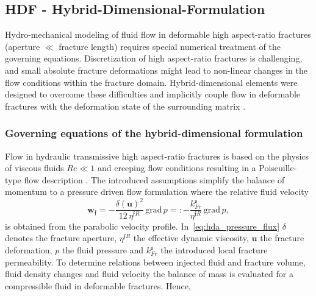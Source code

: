 \subsection{HDF - Hybrid-Dimensional-Formulation}
Hydro-mechanical modeling of fluid flow in deformable high aspect-ratio fractures (aperture $\ll$ fracture length) requires special numerical treatment of the governing equations. Discretization of high aspect-ratio fractures is challenging, and small absolute fracture deformations might lead to non-linear changes in the flow conditions within the fracture domain. Hybrid-dimensional elements were designed to overcome these difficulties and implicitly couple flow in deformable fractures with the deformation state of the surrounding matrix \cite{vinci2014, vinci2015,KIM20112094,KIM20111591,Girault2015,Girault2016,Castelletto2015,segura2004,segura2008coupledI,segura2008coupledII,vinci2014hydro,settgast2017fully,schmidt2019}.
\subsubsection*{Governing equations of the hybrid-dimensional formulation}
Flow in hydraulic transmissive high aspect-ratio fractures is based on the physics of viscous fluids $Re \ll 1$ and creeping flow conditions resulting in a Poiseuille-type flow description \cite{witherspoon1979}. The introduced assumptions simplify the balance of momentum to a pressure driven flow formulation where the relative fluid velocity 
\begin{equation}
\label{eq:hda_pressure_flux}
\mathbf{w}_\mathfrak{f} = -\frac{\delta(\mathbf{u})^2}{12\,\eta^{\mathfrak{f}R}} \, \text{grad} \, p
=: -\frac{k^\mathfrak{s}_{Fr}}{\eta^{\mathfrak{f}R}} \, \text{grad} \, p,
\end{equation}
is obtained from the parabolic velocity profile. In~\eqref{eq:hda_pressure_flux} $\delta$ denotes the fracture aperture, $\eta^{\mathfrak{f}R}$ the effective dynamic viscosity, $\mathbf{u}$ the fracture deformation, $p$ the fluid pressure and $k^\mathfrak{s}_{Fr}$ the introduced local fracture permeability.
To determine relations between injected fluid and fracture volume, fluid density changes and fluid velocity the balance of mass is evaluated for a compressible fluid in deformable fractures. Hence,

